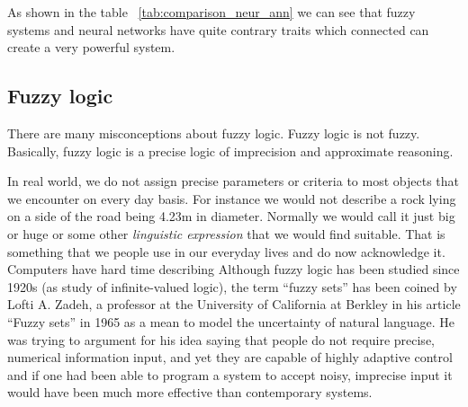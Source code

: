 As shown in the table ~\ref{tab:comparison_neur_ann} we can see that fuzzy systems and neural networks have quite contrary traits which connected can create a very powerful system.

\subsection{Fuzzy logic}
There are many misconceptions about fuzzy logic.
Fuzzy logic is not fuzzy.
Basically, fuzzy logic is a precise logic of imprecision and approximate reasoning.

In real world, we do not assign precise parameters or criteria to most objects that we encounter on every day basis.
For instance we would not describe a rock lying on a side of the road being 4.23m in diameter.
Normally we would call it just big or huge or some other \emph{linguistic expression} that we would find suitable.
That is something that we people use in our everyday lives and do now acknowledge it.
Computers have hard time describing 
Although fuzzy logic has been studied since 1920s (as study of infinite-valued logic), the term ``fuzzy sets'' has been coined by Lofti A. Zadeh, a professor at the University of California at Berkley in his article ``Fuzzy sets'' in 1965 \cite{fuzzy_sets_zadeh} as a mean to model the uncertainty
of natural language.
He was trying to argument for his idea saying that people do not require precise, numerical information input, and yet they are capable of highly adaptive control and if one had been able to program a system to accept noisy, imprecise input it would have been much more effective than contemporary systems.


